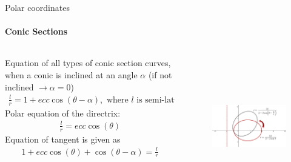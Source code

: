 \documentclass[aspectratio=169]{beamer}
\begin{document}
\begin{frame}[t]{Polar coordinates}
\framesubtitle{Conic Sections}
\footnotesize
    \begin{columns}[T,onlytextwidth]
        \begin{column}{0.49\textwidth}
            Equation of all types of conic section curves, when a conic is inclined at an angle $\alpha$ (if not inclined $\rightarrow \alpha=0$)
            \begin{align*}
                \frac{l}{r}=1+ecc\cos({\theta}-\alpha), \text{ where $l$ is semi-latus rectum}
            \end{align*}
            Polar equation of the directrix:
            \begin{align*}
                \frac{l}{r}=ecc\cos({\theta})
            \end{align*}
            Equation of tangent is given as
            \begin{align*}
                1+ ecc\cos({\theta}) + \cos(\theta-\alpha)=\frac{l}{r}
            \end{align*}
        \end{column}
        \begin{column}{0.49\textwidth}
            \begin{figure}[H]
                \centering\includegraphics[height=6cm,width=1\textwidth,keepaspectratio]{conic_rot.jpg}
                \label{fig:conic_rot.jpg}
            \end{figure}
        \end{column}
    \end{columns}
\end{frame}
\end{document}
